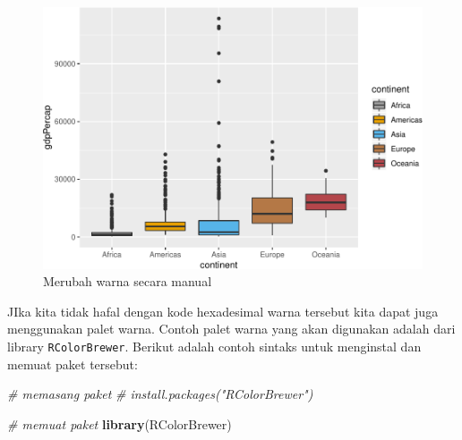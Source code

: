 \documentclass[]{book}
\newenvironment{Shaded}{\begin{snugshade}}{\end{snugshade}}
\newcommand{\KeywordTok}[1]{\textcolor[rgb]{0.13,0.29,0.53}{\textbf{#1}}}
\newcommand{\DataTypeTok}[1]{\textcolor[rgb]{0.13,0.29,0.53}{#1}}
\newcommand{\StringTok}[1]{\textcolor[rgb]{0.31,0.60,0.02}{#1}}
\newcommand{\CommentTok}[1]{\textcolor[rgb]{0.56,0.35,0.01}{\textit{#1}}}
\newcommand{\OperatorTok}[1]{\textcolor[rgb]{0.81,0.36,0.00}{\textbf{#1}}}
\newcommand{\NormalTok}[1]{#1}
\begin{document}
\begin{Shaded}
\end{Shaded}

\begin{figure}

{\centering \includegraphics[width=0.7\linewidth]{EnvStat_files/figure-latex/ggcolor4-1} 

}

\caption{Merubah warna secara manual}\label{fig:ggcolor4}
\end{figure}

JIka kita tidak hafal dengan kode hexadesimal warna tersebut kita dapat
juga menggunakan palet warna. Contoh palet warna yang akan digunakan
adalah dari library \texttt{RColorBrewer}. Berikut adalah contoh sintaks
untuk menginstal dan memuat paket tersebut:

\begin{Shaded}
\begin{Highlighting}[]
\CommentTok{# memasang paket}
\CommentTok{# install.packages("RColorBrewer")}

\CommentTok{# memuat paket}
\KeywordTok{library}\NormalTok{(RColorBrewer)}
\end{Highlighting}
\end{Shaded}
\end{document}
